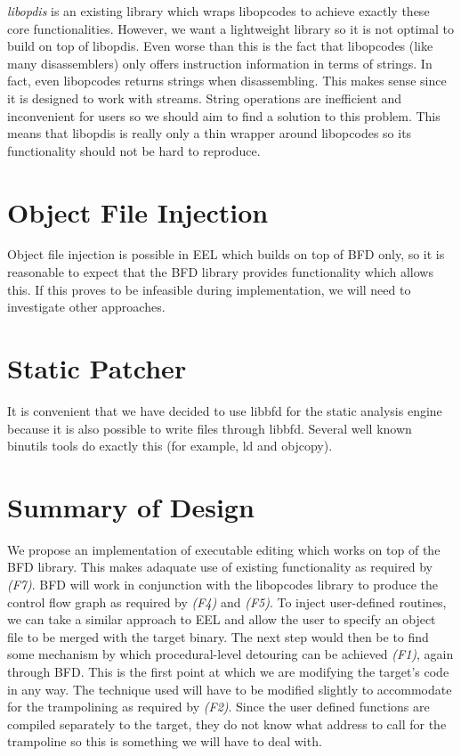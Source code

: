 \emph{libopdis} is an existing library which wraps libopcodes to achieve exactly these core functionalities. However, we want a lightweight library so it is not optimal to build on top of libopdis. Even worse than this is the fact that libopcodes (like many disassemblers) only offers instruction information in terms of strings. In fact, even libopcodes returns strings when disassembling. This makes sense since it is designed to work with streams. String operations are inefficient and inconvenient for users so we should aim to find a solution to this problem. This means that libopdis is really only a thin wrapper around libopcodes so its functionality should not be hard to reproduce.

\section{Object File Injection}

Object file injection is possible in EEL which builds on top of BFD only, so it is reasonable to expect that the BFD library provides functionality which allows this. If this proves to be infeasible during implementation, we will need to investigate other approaches.

\section{Static Patcher}

It is convenient that we have decided to use libbfd for the static analysis engine because it is also possible to write files through libbfd. Several well known binutils tools do exactly this (for example, ld and objcopy).

\section{Summary of Design}

We propose an implementation of executable editing which works on top of the BFD library. This makes adaquate use of existing functionality as required by \emph{(F7)}. BFD will work in conjunction with the libopcodes library to produce the control flow graph as required by \emph{(F4)} and \emph{(F5)}. To inject user-defined routines, we can take a similar approach to EEL and allow the user to specify an object file to be merged with the target binary. The next step would then be to find some mechanism by which procedural-level detouring can be achieved \emph{(F1)}, again through BFD. This is the first point at which we are modifying the target's code in any way. The technique used will have to be modified slightly to accommodate for the trampolining as required by \emph{(F2)}. Since the user defined functions are compiled separately to the target, they do not know what address to call for the trampoline so this is something we will have to deal with.